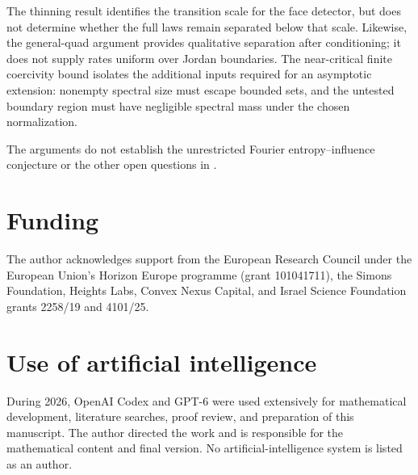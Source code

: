 \documentclass[11pt]{amsart}
\theoremstyle{remark}
\begin{document}
The thinning result identifies the transition scale for the face detector, but does not determine whether the full laws remain separated below that scale. Likewise, the general-quad argument provides qualitative separation after conditioning; it does not supply rates uniform over Jordan boundaries. The near-critical finite coercivity bound isolates the additional inputs required for an asymptotic extension: nonempty spectral size must escape bounded sets, and the untested boundary region must have negligible spectral mass under the chosen normalization.

The arguments do not establish the unrestricted Fourier entropy--influence conjecture or the other open questions in \cite[Section~11]{GPS}.

\section*{Funding}
The author acknowledges support from the European Research Council under the European Union's Horizon Europe programme (grant 101041711), the Simons Foundation, Heights Labs, Convex Nexus Capital, and Israel Science Foundation grants 2258/19 and 4101/25.

\section*{Use of artificial intelligence}
During 2026, OpenAI Codex and GPT-6 were used extensively for mathematical development, literature searches, proof review, and preparation of this manuscript. The author directed the work and is responsible for the mathematical content and final version. No artificial-intelligence system is listed as an author.
\end{document}
